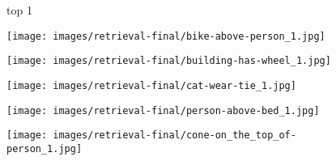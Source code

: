 \documentclass[10pt,twocolumn,letterpaper]{article}
\begin{document}
\begin{figure*}[t]
\begin{minipage}[b]{0.005\textwidth}
    	\centering
    	\begin{turn}{90}
    	top 1
    	\end{turn}	
    \vspace{3.5ex}
    \end{minipage}
    \hspace{0.01\textwidth}
    \begin{minipage}[t]{0.18\textwidth}
    	\centering
       	\texttt{[image: images/retrieval-final/bike-above-person\_1.jpg]}\\
       	\vspace{0.2ex}
    \end{minipage}
    \hspace{0.005\textwidth}
\begin{minipage}[t]{0.18\textwidth}
       \centering
       \texttt{[image: images/retrieval-final/building-has-wheel\_1.jpg]}\\
       \vspace{0.2ex}
    \end{minipage}
    \hspace{0.005\textwidth}
\begin{minipage}[t]{0.18\textwidth}
    	\centering
       	\texttt{[image: images/retrieval-final/cat-wear-tie\_1.jpg]}\\
       	\vspace{0.2ex}
    \end{minipage}
    \hspace{0.005\textwidth}
\begin{minipage}[t]{0.18\textwidth}
    	\centering
       	\texttt{[image: images/retrieval-final/person-above-bed\_1.jpg]}\\
       	\vspace{0.2ex}
    \end{minipage}
    \hspace{0.005\textwidth}  
\begin{minipage}[t]{0.18\textwidth}
    	\centering
       	\texttt{[image: images/retrieval-final/cone-on\_the\_top\_of-person\_1.jpg]}\\
      	\vspace{0.2ex}
    \end{minipage} 
    

\end{figure*}
\end{document}
